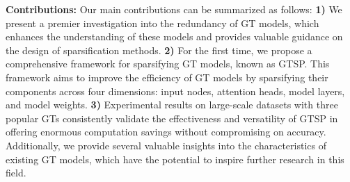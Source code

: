 \documentclass[letterpaper]{article} %
\begin{document}
\textbf{Contributions:} Our main contributions can be summarized as follows:  \textbf{1)} We present a premier investigation into the redundancy of GT models, which enhances the understanding of these models and provides valuable guidance on the design of sparsification methods. \textbf{2)} For the first time, we propose a comprehensive framework for sparsifying GT models, known as GTSP. This framework aims to improve the efficiency of GT models by sparsifying their components across four dimensions: input nodes, attention heads, model layers, and model weights. \textbf{3)} Experimental results on large-scale datasets with three popular GTs consistently validate the effectiveness and versatility of GTSP in offering enormous computation savings without compromising on accuracy. Additionally, we provide several valuable insights into the characteristics of existing GT models, which have the potential to inspire further research in this field.









\end{document}
